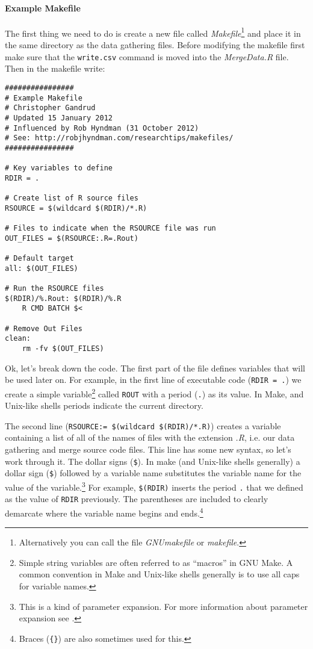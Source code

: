\paragraph{Example Makefile}

The first thing we need to do is create a new file called \emph{Makefile}\footnote{Alternatively you can call the file \emph{GNUmakefile} or \emph{makefile}.} and place it in the same directory as the data gathering files. Before modifying the makefile first make sure that the \texttt{write.csv} command is moved into the \emph{MergeData.R} file. Then in the makefile write:

\begin{knitrout}
	\color{fgcolor}
	\begin{kframe}
		\begin{verbatim}
################
# Example Makefile
# Christopher Gandrud
# Updated 15 January 2012
# Influenced by Rob Hyndman (31 October 2012)
# See: http://robjhyndman.com/researchtips/makefiles/
################

# Key variables to define
RDIR = .

# Create list of R source files
RSOURCE = $(wildcard $(RDIR)/*.R)

# Files to indicate when the RSOURCE file was run
OUT_FILES = $(RSOURCE:.R=.Rout)

# Default target
all: $(OUT_FILES) 

# Run the RSOURCE files
$(RDIR)/%.Rout: $(RDIR)/%.R
    R CMD BATCH $<

# Remove Out Files
clean: 
    rm -fv $(OUT_FILES)
		\end{verbatim}
	\end{kframe}
\end{knitrout}

\noindent Ok, let's break down the code. The first part of the file defines variables that will be used later on. For example, in the first line of executable code (\texttt{RDIR = .}) we create a simple variable\footnote{Simple string variables are often referred to as ``macros'' in GNU Make. A common convention in Make and Unix-like shells generally is to use all caps for variable names.} called \texttt{ROUT} with a period (\texttt{.}) as its value. In Make, and Unix-like shells periods indicate the current directory. 

The second line (\verb|RSOURCE:= $(wildcard $(RDIR)/*.R)|) creates a variable containing a list of all of the names of files with the extension \emph{.R}, i.e. our data gathering and merge source code files. This line has some new syntax, so let's work through it. The dollar signs (\verb|$|). In make (and Unix-like shells generally) a dollar sign (\verb|$|) followed by a variable name substitutes the variable name for the value of the variable.\footnote{This is a kind of parameter expansion. For more information about parameter expansion see \citep{Frazier2008}.} For example, \verb|$(RDIR)| inserts the period \texttt{.} that we defined as the value of \texttt{RDIR} previously. The parentheses are included to clearly demarcate where the variable name begins and ends.\footnote{Braces (\texttt{\{\}}) are also sometimes used for this.} 

